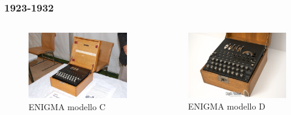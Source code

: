 	\begin{frame}
		\frametitle{1923-1932}
		\begin{columns}
			\begin{column}{0.45\textwidth}
				\begin{figure}
					\centering
					\includegraphics[width=\columnwidth]{img/C}
					\caption{ENIGMA modello C}
				\end{figure}
			\end{column}
			\begin{column}{0.45\textwidth}
				\begin{figure}
					\centering
					\includegraphics[width=\columnwidth]{img/D}
					\caption{ENIGMA modello D}
				\end{figure}
			\end{column}
		\end{columns}		
	\end{frame}
	
